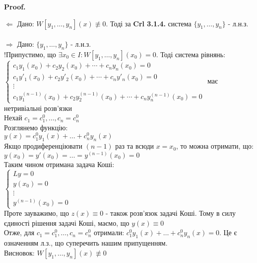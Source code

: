 \documentclass[a4paper, 10pt]{article}
\makeatletter
\def\qed{$\blacksquare$}
\def\rightproof{$\boxed{\Rightarrow}$ }
\def\leftproof{$\boxed{\Leftarrow}$ }
\theoremstyle{theoremdd}
\theoremstyle{theoremdd}
\theoremstyle{theoremdd}
\theoremstyle{theoremdd}
\theoremstyle{theoremdd}
\theoremstyle{theoremdd}
\theoremstyle{theoremdd}
\theoremstyle{theoremdd}
\renewenvironment{proof}[1][Proof.\\]{\par
\pushQED{\hfill \qed}%
\normalfont \topsep6\p@\@plus6\p@\relax
\trivlist
\item\relax
{\bfseries
#1\@addpunct{.}}\hspace\labelsep\ignorespaces
}{%
\popQED\endtrivlist\@endpefalse
}
\makeatother
\begin{document}
\begin{proof}
\leftproof Дано: $W[y_1, \dots, y_n](x) \not\equiv 0$. Тоді за \textbf{Crl 3.1.4.} система $\{y_1, \dots, y_n\}$ - л.н.з.\\
\bigskip \\
\rightproof Дано: $\{y_1, \dots, y_n\}$ - л.н.з.\\
!Припустимо, що $\exists x_0 \in I: W[y_1, \dots, y_n](x_0) = 0$. Тоді система рівнянь:
$\begin{cases}
c_1y_1(x_0) + c_2y_2(x_0) + \cdots + c_n y_n(x_0) = 0 \\
c_1y'_1(x_0) + c_2y'_2(x_0) + \cdots + c_n y'_n(x_0) = 0 \\
\vdots \\
c_1y^{(n-1)}_1(x_0) + c_2y^{(n-1)}_2(x_0) + \cdots + c_n y^{(n-1)}_n(x_0) = 0
\end{cases}
$
має нетривіальні розв'язки\\
Нехай $c_1 = c_1^0, \dots, c_n = c_n^0$\\
Розглянемо функцію:\\
$y(x) = c_1^0 y_1(x) + \dots + c_n^0 y_n(x)$\\
Якщо продиференціювати $(n-1)$ раз та всюди $x=x_0$, то можна отримати, що:\\
$y(x_0) = y'(x_0) = \dots = y^{(n-1)}(x_0) = 0$\\
Таким чином отримана задача Коші:\\
$
\begin{cases}
 Ly = 0\\
 y(x_0) = 0 \\
 \vdots \\
 y^{(n-1)}(x_0) = 0
\end{cases}
$\\
Проте зауважимо, що $z(x) \equiv 0$ - також розв'язок задачі Коші. Тому в силу єдиності рішення задачі Коші, маємо, що $y(x) \equiv 0$\\
Отже, для $c_1 = c_1^0, \dots, c_n = c_n^0$ отримали: $c_1^0 y_1(x) + \dots + c_n^0 y_n(x) = 0$. Це є означенням л.з., що суперечить нашим припущенням.\\
Висновок: $W[y_1, \dots, y_n](x) \not\equiv 0$ 
\end{proof}
\end{document}
